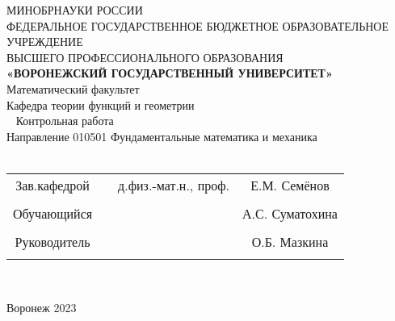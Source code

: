 \begin{center}
    \hfill \break
    \large{МИНОБРНАУКИ РОССИИ}\\
    \footnotesize{ФЕДЕРАЛЬНОЕ ГОСУДАРСТВЕННОЕ БЮДЖЕТНОЕ ОБРАЗОВАТЕЛЬНОЕ УЧРЕЖДЕНИЕ}\\ 
    \footnotesize{ВЫСШЕГО ПРОФЕССИОНАЛЬНОГО ОБРАЗОВАНИЯ}\\
    \small{\textbf{«ВОРОНЕЖСКИЙ ГОСУДАРСТВЕННЫЙ УНИВЕРСИТЕТ»}}\\
    \hfill \break
    \normalsize{Математический факультет}\\
     \hfill \break
    \normalsize{Кафедра теории функций и геометрии}\\
    \hfill\break
    \hfill \break
    \hfill \break
    \hfill \break
    \hfill \break
    \hfill \break
    \hfill \break
    \hfill \break
    \hfill \break
    \hfill \break\
    \hfill \break
    \hfill \break
    \normalsize{Контрольная работа\\
    \hfill \break
    Направление  010501 Фундаментальные математика и механика\\

    \hfill \break
    }\\
    \hfill \break
    \hfill \break
    \end{center}
    \hfill \break
     
    \normalsize{ 
    \begin{tabular}{cccc}
    Зав.кафедрой & \underline{\hspace{3cm}} &  д.физ.-мат.н.,  проф. & Е.М. Семёнов \\\\
    Обучающийся & \underline{\hspace{3cm}} & &А.С. Суматохина \\\\
    Руководитель & \underline{\hspace{3cm}}&  & О.Б. Мазкина \\\\
    \end{tabular}
    }\\
    \hfill \break
    \hfill \break
    \hfill \break
    \hfill \break
    \hfill \break
    \hfill \break
    \hfill \break
    \hfill \break
    \hfill \break
    \hfill \break
    \begin{center} Воронеж 2023 \end{center}
    \thispagestyle{empty} %
     
